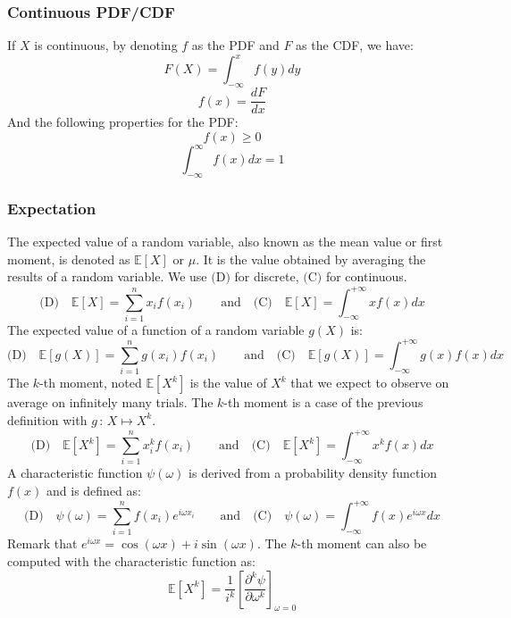 \documentclass[twoside,twocolumn]{article}
\begin{document}
\subsubsection{Continuous PDF/CDF}
If $X$ is continuous, by denoting $f$ as the PDF and $F$ as the CDF, we have:
\begin{equation}
  F(X) = \int_{-\infty}^x f(y) dy
\end{equation}
\begin{equation}
  f(x) = \frac{dF}{dx}
\end{equation}
And the following properties for the PDF:
\begin{equation}
  f(x) \geq 0
\end{equation}
\begin{equation}
  \int_{-\infty}^{\infty} f(x) dx = 1
\end{equation}
\subsubsection{Expectation}
The expected value of a random variable, also known as the mean value or
first moment, is denoted as $\mathbb { E }[X]$ or $\mu$. It is the value obtained by
averaging the results of a random variable.
We use $\mbox{(D)}$ for discrete, $\mbox{(C)}$ for continuous.
\begin{equation}
  \mbox{(D)}\quad \mathbb { E }[X]=\sum_{i=1}^nx_if(x_i)\quad\quad\mbox{and}\quad\mbox{(C)}\quad \mathbb { E }[X]=\int_{-\infty}^{+\infty}xf(x)dx
\end{equation}
The expected value of a function of a random variable $g(X)$ is:
\begin{equation}
  \mbox{(D)}\quad \mathbb { E }[g(X)]=\sum_{i=1}^ng(x_i)f(x_i)\quad\quad\mbox{and}\quad\mbox{(C)}\quad \mathbb { E }[g(X)]=\int_{-\infty}^{+\infty}g(x)f(x)dx
\end{equation}
The $k$-th moment, noted $\mathbb { E }[X^k]$ is the value of $X^k$ that we expect to observe
on average on infinitely many trials. The $k$-th moment is a case of the previous
definition with $g \,:\, X \mapsto X^k$.
\begin{equation}
  \mbox{(D)}\quad \mathbb { E }[X^k]=\sum_{i=1}^nx_i^kf(x_i) \quad\quad\mbox{and}\quad\mbox{(C)}\quad \mathbb { E }[X^k]=\int_{-\infty}^{+\infty}x^kf(x)dx
\end{equation}
A characteristic function $\psi(\omega)$ is derived from a probability density
function $f(x)$ and is defined as:
\begin{equation}
  \mbox{(D)}\quad \psi(\omega)=\sum_{i=1}^nf(x_i)e^{i\omega x_i} \quad\quad\mbox{and}\quad\mbox{(C)}\quad \psi(\omega)=\int_{-\infty}^{+\infty}f(x)e^{i\omega x}dx
\end{equation}
Remark that $e^{i\omega x} = \cos(\omega x)+ i \sin(\omega x)$. The $k$-th moment
can also be computed with the characteristic function as:
\begin{equation}
  \mathbb { E }[X^k]=\frac{1}{i^k}\left[\frac{\partial^k\psi}{\partial\omega^k}\right]_{\omega=0}
\end{equation}
\end{document}

